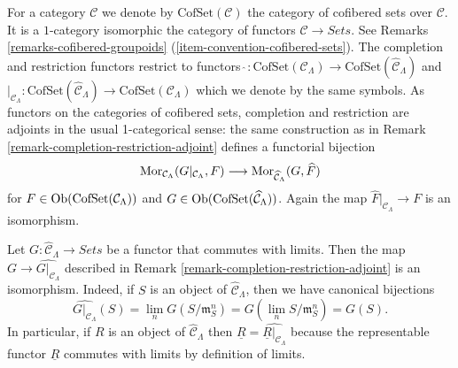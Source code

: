 \begin{remark}
\label{remark-completion-restriction-cofset-adjoint}
For a category $\mathcal{C}$ we denote by $\text{CofSet}(\mathcal{C})$ the
category of cofibered sets over $\mathcal{C}$. It is a $1$-category
isomorphic the category of functors $\mathcal{C} \to \textit{Sets}$.
See Remarks \ref{remarks-cofibered-groupoids}
(\ref{item-convention-cofibered-sets}).
The completion and restriction functors restrict to functors
$\widehat{~} : \text{CofSet}(\mathcal{C}_\Lambda) \to
\text{CofSet}(\widehat{\mathcal{C}}_\Lambda)$ and
$|_{\mathcal{C}_\Lambda} : \text{CofSet}(\widehat{\mathcal{C}}_\Lambda) \to
\text{CofSet}(\mathcal{C}_\Lambda)$ which we denote by the same symbols.
As functors on the categories of cofibered sets, completion and restriction
are adjoints in the usual 1-categorical sense: the same construction as in
Remark \ref{remark-completion-restriction-adjoint} defines a functorial
bijection
$$
\mathop{\mathrm{Mor}}\nolimits_{\mathcal{C}_\Lambda}(G|_{\mathcal{C}_\Lambda}, F)
\longrightarrow
\mathop{\mathrm{Mor}}\nolimits_{\widehat{\mathcal{C}}_\Lambda}(G, \widehat{F})
$$
for $F \in \mathop{\mathrm{Ob}}\nolimits(\text{CofSet}(\mathcal{C}_\Lambda))$ and
$G \in \mathop{\mathrm{Ob}}\nolimits(\text{CofSet}(\widehat{\mathcal{C}}_\Lambda))$.
Again the map $\widehat{F}|_{\mathcal{C}_\Lambda} \to F$ is an
isomorphism.
\end{remark}

\begin{remark}
\label{remark-restrict-complete-continuous-functor}
Let $G : \widehat{\mathcal{C}}_\Lambda \to \textit{Sets}$
be a functor that commutes with limits.
Then the map $G \to \widehat{G|_{\mathcal{C}_\Lambda}}$ described in
Remark \ref{remark-completion-restriction-adjoint}
is an isomorphism. Indeed, if $S$ is  an object of
$\widehat{\mathcal{C}}_\Lambda$, then we have canonical bijections
$$
\widehat{G|_{\mathcal{C}_\Lambda}}(S) =
\lim_n G(S/\mathfrak{m}_S^n) =
G(\lim_n S/\mathfrak{m}_S^n) = G(S).
$$
In particular, if $R$ is an object of $\widehat{\mathcal{C}}_\Lambda$ then
$\underline{R} = \widehat{\underline{R}|_{\mathcal{C}_\Lambda}}$ because
the representable functor $\underline{R}$ commutes with limits by definition
of limits.
\end{remark}

